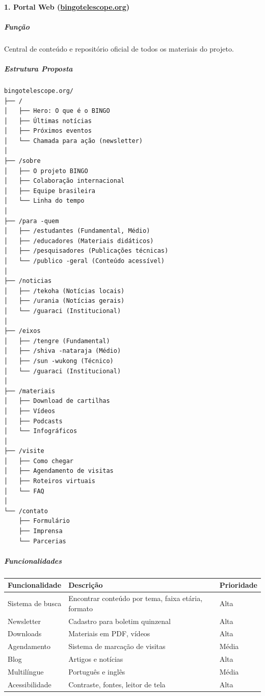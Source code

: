 \paragraph{1. Portal Web (\href{http://bingotelescope.org}{bingotelescope.org})}

\subparagraph{Função}

Central de conteúdo e repositório oficial de todos os materiais do projeto.

\subparagraph{Estrutura Proposta}

\begin{verbatim}
bingotelescope.org/
├── /
│   ├── Hero: O que é o BINGO
│   ├── Últimas notícias
│   ├── Próximos eventos
│   └── Chamada para ação (newsletter)
│
├── /sobre
│   ├── O projeto BINGO
│   ├── Colaboração internacional
│   ├── Equipe brasileira
│   └── Linha do tempo
│
├── /para -quem
│   ├── /estudantes (Fundamental, Médio)
│   ├── /educadores (Materiais didáticos)
│   ├── /pesquisadores (Publicações técnicas)
│   └── /publico -geral (Conteúdo acessível)
│
├── /noticias
│   ├── /tekoha (Notícias locais)
│   ├── /urania (Notícias gerais)
│   └── /guaraci (Institucional)
│
├── /eixos
│   ├── /tengre (Fundamental)
│   ├── /shiva -nataraja (Médio)
│   ├── /sun -wukong (Técnico)
│   └── /guaraci (Institucional)
│
├── /materiais
│   ├── Download de cartilhas
│   ├── Vídeos
│   ├── Podcasts
│   └── Infográficos
│
├── /visite
│   ├── Como chegar
│   ├── Agendamento de visitas
│   ├── Roteiros virtuais
│   └── FAQ
│
└── /contato
    ├── Formulário
    ├── Imprensa
    └── Parcerias
\end{verbatim}

\subparagraph{Funcionalidades}

\bigskip\noindent
\begin{tabular}{p{}p{}p{}}
\toprule
Funcionalidade & Descrição & Prioridade \\
\hline
Sistema de busca & Encontrar conteúdo por tema, faixa etária, formato & Alta \\
Newsletter & Cadastro para boletim quinzenal & Alta \\
Downloads & Materiais em PDF, vídeos & Alta \\
Agendamento & Sistema de marcação de visitas & Média \\
Blog & Artigos e notícias & Alta \\
Multilíngue & Português e inglês & Média \\
Acessibilidade & Contraste, fontes, leitor de tela & Alta \\
\bottomrule
\end{tabular}


